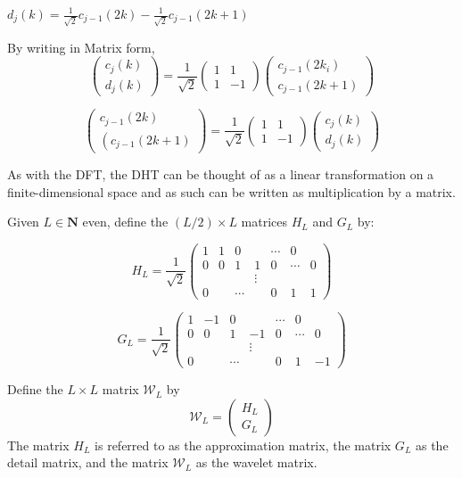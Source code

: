 $d_{j}(k)=\frac{1}{\sqrt{2}} c_{j-1}(2 k)-\frac{1}{\sqrt{2}} c_{j-1}(2 k+1)$

By writing in Matrix form,
$$
\left(\begin{array}{c}{c_{j}(k)} \\ {d_{j}(k)}\end{array}\right)=\frac{1}{\sqrt{2}}\left(\begin{array}{cc}{1} & {1} \\ {1} & {-1}\end{array}\right)\left(\begin{array}{c}{c_{j-1}\left(2 k_{i}\right)} \\ {c_{j-1}(2 k+1)}\end{array}\right)
$$

$$
\left(\begin{array}{c}{c_{j-1}(2 k)} \\ {\left( c_{j-1}(2 k+1)\right.}\end{array}\right)=\frac{1}{\sqrt{2}}\left(\begin{array}{cc}{1} & {1} \\ {1} & {-1}\end{array}\right)\left(\begin{array}{c}{c_{j}(k)} \\ {d_{j}(k)}\end{array}\right)
$$

As with the DFT, the DHT can be thought of as a linear transformation on a finite-dimensional space and as such can be written as multiplication by a matrix.

\begin{definition}

Given $L \in \mathbf{N}$ even, define the $(L / 2) \times L$ matrices $H_{L}$ and $G_{L}$ by:

$$
H_{L}=\frac{1}{\sqrt{2}}\left(\begin{array}{cccccc}{1} & {1} & {0} & {} & {\cdots} & {0} \\ {0} & {0} & {1} & {1} & {0} & {\cdots} & {0} \\ {} & {} & {} & {\vdots} & {} \\ {0} & {} & {\cdots} & {} & {0} & {1} & {1}\end{array}\right)
$$

$$
G_{L}=\frac{1}{\sqrt{2}}\left(\begin{array}{cccccc}{1} & {-1} & {0} & {} & {\cdots} & {0} \\ {0} & {0} & {1} & {-1} & {0} & {\cdots} & {0} \\ {} & {} & {} & {\vdots} \\ {0} & {} & {\cdots} & {} & {0} & {1} & {-1}\end{array}\right)
$$

Define the $L \times L$ matrix $\mathcal{W}_{L}$ by
$$
\mathcal{W}_{L}=\left(\begin{array}{c}{H_{L}} \\ {G_{L}}\end{array}\right)
$$
The matrix $H_{L}$ is referred to as the approximation matrix, the matrix $G_{L}$ as the detail matrix, and the matrix $\mathcal{W}_{L}$ as the wavelet matrix.
\end{definition}

